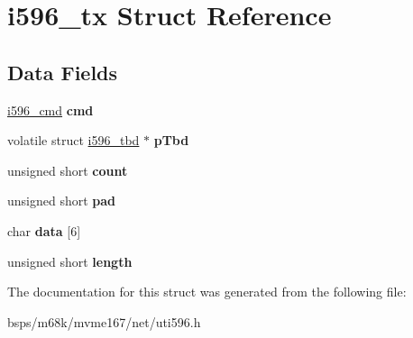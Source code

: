 \hypertarget{structi596__tx}{}\section{i596\+\_\+tx Struct Reference}
\label{structi596__tx}
\subsection*{Data Fields}
\begin{DoxyCompactItemize}
\item 
\mbox{\label{structi596__tx_abf4bfa55a4e44e2d212aa9dd918bba44}} 
\mbox{\hyperlink{structi596__cmd}{i596\+\_\+cmd}} {\bfseries cmd}
\item 
\mbox{\label{structi596__tx_acd6ea3ab673a89cc41d951ef33a2bd3b}} 
volatile struct \mbox{\hyperlink{structi596__tbd}{i596\+\_\+tbd}} $\ast$ {\bfseries p\+Tbd}
\item 
\mbox{\label{structi596__tx_a259dbf57b86f21141d916259883106a9}} 
unsigned short {\bfseries count}
\item 
\mbox{\label{structi596__tx_aecb83e65abc863e3d384f3677bdd0576}} 
unsigned short {\bfseries pad}
\item 
\mbox{\label{structi596__tx_a00c266c88dc8f89addf9eefd69962f3d}} 
char {\bfseries data} \mbox{[}6\mbox{]}
\item 
\mbox{\label{structi596__tx_ad399294ee1ffd711d27aa6132f371565}} 
unsigned short {\bfseries length}
\end{DoxyCompactItemize}


The documentation for this struct was generated from the following file\+:\begin{DoxyCompactItemize}
\item 
bsps/m68k/mvme167/net/uti596.\+h\end{DoxyCompactItemize}
